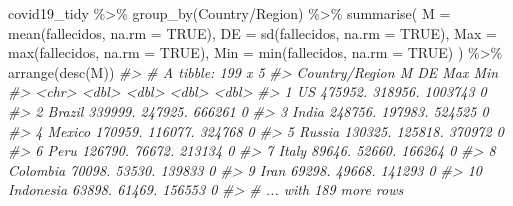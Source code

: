 \documentclass[
]{book}
\newenvironment{Shaded}{\begin{snugshade}}{\end{snugshade}}
\newcommand{\AttributeTok}[1]{\textcolor[rgb]{0.77,0.63,0.00}{#1}}
\newcommand{\CommentTok}[1]{\textcolor[rgb]{0.56,0.35,0.01}{\textit{#1}}}
\newcommand{\ConstantTok}[1]{\textcolor[rgb]{0.00,0.00,0.00}{#1}}
\newcommand{\FunctionTok}[1]{\textcolor[rgb]{0.00,0.00,0.00}{#1}}
\newcommand{\NormalTok}[1]{#1}
\newcommand{\SpecialCharTok}[1]{\textcolor[rgb]{0.00,0.00,0.00}{#1}}
\newcommand{\StringTok}[1]{\textcolor[rgb]{0.31,0.60,0.02}{#1}}
\begin{document}
\begin{Shaded}
\begin{Highlighting}[]
\NormalTok{covid19\_tidy }\SpecialCharTok{\%\textgreater{}\%}
  \FunctionTok{group\_by}\NormalTok{(}\StringTok{\textasciigrave{}}\AttributeTok{Country/Region}\StringTok{\textasciigrave{}}\NormalTok{) }\SpecialCharTok{\%\textgreater{}\%}
  \FunctionTok{summarise}\NormalTok{(}
    \AttributeTok{M =} \FunctionTok{mean}\NormalTok{(fallecidos, }\AttributeTok{na.rm =} \ConstantTok{TRUE}\NormalTok{),}
    \AttributeTok{DE =} \FunctionTok{sd}\NormalTok{(fallecidos, }\AttributeTok{na.rm =} \ConstantTok{TRUE}\NormalTok{),}
    \AttributeTok{Max =} \FunctionTok{max}\NormalTok{(fallecidos, }\AttributeTok{na.rm =} \ConstantTok{TRUE}\NormalTok{),}
    \AttributeTok{Min =} \FunctionTok{min}\NormalTok{(fallecidos, }\AttributeTok{na.rm =} \ConstantTok{TRUE}\NormalTok{)}
\NormalTok{  ) }\SpecialCharTok{\%\textgreater{}\%}
  \FunctionTok{arrange}\NormalTok{(}\FunctionTok{desc}\NormalTok{(M))}
\CommentTok{\#\textgreater{} \# A tibble: 199 x 5}
\CommentTok{\#\textgreater{}    \textasciigrave{}Country/Region\textasciigrave{}       M      DE     Max   Min}
\CommentTok{\#\textgreater{}    \textless{}chr\textgreater{}              \textless{}dbl\textgreater{}   \textless{}dbl\textgreater{}   \textless{}dbl\textgreater{} \textless{}dbl\textgreater{}}
\CommentTok{\#\textgreater{}  1 US               475952. 318956. 1003743     0}
\CommentTok{\#\textgreater{}  2 Brazil           339999. 247925.  666261     0}
\CommentTok{\#\textgreater{}  3 India            248756. 197983.  524525     0}
\CommentTok{\#\textgreater{}  4 Mexico           170959. 116077.  324768     0}
\CommentTok{\#\textgreater{}  5 Russia           130325. 125818.  370972     0}
\CommentTok{\#\textgreater{}  6 Peru             126790.  76672.  213134     0}
\CommentTok{\#\textgreater{}  7 Italy             89646.  52660.  166264     0}
\CommentTok{\#\textgreater{}  8 Colombia          70098.  53530.  139833     0}
\CommentTok{\#\textgreater{}  9 Iran              69298.  49668.  141293     0}
\CommentTok{\#\textgreater{} 10 Indonesia         63898.  61469.  156553     0}
\CommentTok{\#\textgreater{} \# ... with 189 more rows}
\end{Highlighting}
\end{Shaded}
\end{document}
